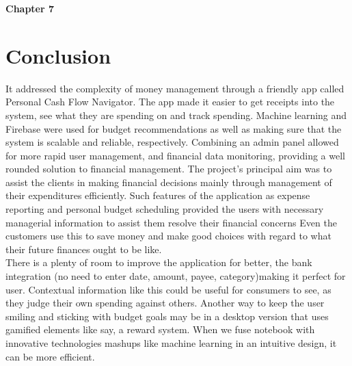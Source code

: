 \documentclass[12pt]{article}
\begin{document}
\newpage


\noindent
\LARGE \textbf{Chapter 7}

\vspace{1 cm}

\noindent
\section{Conclusion}

\vspace{0.5cm} %

\noindent
\normalsize It addressed the complexity of money management through a friendly app called Personal Cash Flow Navigator. The app made it easier to get receipts into the system, see what they are spending on and track spending. Machine learning and Firebase were used for budget recommendations as well as making sure that the system is scalable and reliable, respectively. Combining an admin panel allowed for more rapid user management, and financial data monitoring, providing a well rounded solution to financial management.
The project’s principal aim was to assist the clients in making  financial decisions mainly through management of their expenditures efficiently. Such features of the application as expense reporting and personal budget scheduling provided the users with necessary managerial information to assist them resolve their financial concerns Even the customers use this to save money and make good choices with regard to what their future finances ought to be like.\\
There is a plenty of room to improve the application for better, the bank integration (no need to enter date, amount, payee, category)making it perfect for user. Contextual information like this could be useful for consumers to see, as they judge their own spending against others. Another way to keep the user smiling and sticking with budget goals may be in a desktop version that uses gamified elements like say, a reward system.
When we fuse notebook with innovative technologies mashups like machine learning in an intuitive design, it can be more efficient.
\newpage
\vspace*{1.5cm} %

\noindent
\normalsize


\end{document}
